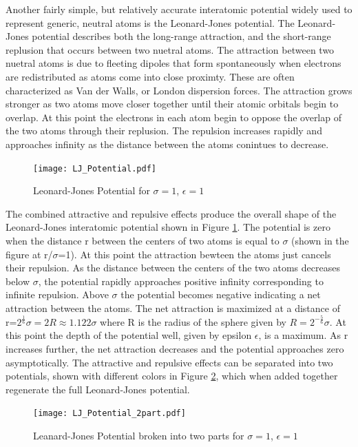 \documentclass[double,12pt]{beavtex}
\begin{document}
Another fairly simple, but relatively accurate interatomic potential widely 
used to represent generic, neutral atoms is the Leonard-Jones potential. 
The Leonard-Jones potential describes both the long-range attraction, 
and the short-range replusion that occurs between two nuetral atoms. 
The attraction between two nuetral atoms is due to fleeting dipoles that 
form spontaneously when electrons are redistributed as atoms come into 
close proximty. These are often characterized as Van der Walls, or London 
dispersion forces. The attraction grows stronger as two atoms move closer 
together until their atomic orbitals begin to overlap. 
At this point the electrons in each atom begin to oppose the overlap of 
the two atoms through their replusion. The repulsion increases rapidly and 
approaches infinity as the distance between the atoms conintues to decrease.  
 
\begin{figure}[h!]
    \centering
    \texttt{[image: LJ\_Potential.pdf]}
    \caption{Leonard-Jones Potential for $\sigma=1$, $\epsilon=1$}
    \label{fig:LJ_potential}
  \end{figure}

The combined attractive and repulsive effects produce the overall shape of 
the Leonard-Jones interatomic potential shown in Figure \ref{fig:LJ_potential}. 
The potential is zero when the distance r between the centers of two atoms 
is equal to $\sigma$ (shown in the figure at r/$\sigma$=1). At this point 
the attraction bewteen the atoms just cancels their repulsion. As the distance 
between the centers of the two atoms decreases below $\sigma$, the potential 
rapidly approaches positive infinity corresponding to infinite repulsion. 
Above $\sigma$ the potential becomes negative indicating a net attraction 
between the atoms. The net attraction is maximized at a distance of 
r=$2^\frac{1}{6}\sigma=2R\approx{1.122}\sigma$ where R is the radius of 
the sphere given by $R={2^{-\frac{5}{6}}}\sigma$. At this point the depth of
the potential well, given by epsilon $\epsilon$, is a maximum. As r increases 
further, the net attraction decreases and the potential approaches zero
asymptotically. The attractive and repulsive effects can be separated into two
potentials, shown with different colors in Figure \ref{fig:LJ_potential_2parts}, 
which when added together regenerate the full Leonard-Jones potential. 

\begin{figure}[h!]
    \centering
    \texttt{[image: LJ\_Potential\_2part.pdf]}
    \caption{Leanard-Jones Potential broken into two parts for $\sigma=1$, $\epsilon=1$}
    \label{fig:LJ_potential_2parts}
  \end{figure}
\end{document}
